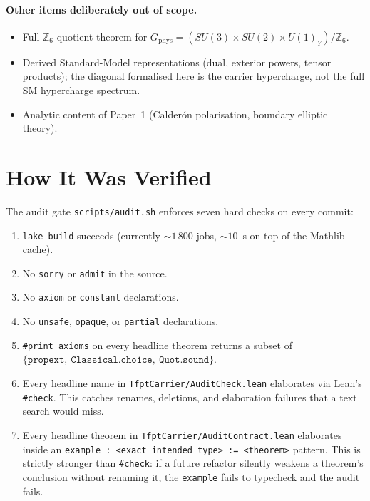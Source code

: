 \paragraph{Other items deliberately out of scope.}
\begin{itemize}[leftmargin=1.6em, itemsep=0pt]
\item Full $\mathbb Z_6$-quotient theorem for
    $G_{\mathrm{phys}} = (SU(3)\times SU(2)\times U(1)_Y)/\mathbb Z_6$.
\item Derived Standard-Model representations (dual, exterior
    powers, tensor products); the diagonal formalised here is
    the carrier hypercharge, not the full SM hypercharge
    spectrum.
\item Analytic content of Paper~1 (Calder\'on polarisation,
    boundary elliptic theory).
\end{itemize}

\section{How It Was Verified}

The audit gate \texttt{scripts/audit.sh} enforces seven hard
checks on every commit:

\begin{enumerate}[leftmargin=1.6em, itemsep=0pt]
\item \texttt{lake build} succeeds (currently $\sim 1\,800$ jobs,
      $\sim 10$~s on top of the Mathlib cache).
\item No \texttt{sorry} or \texttt{admit} in the source.
\item No \texttt{axiom} or \texttt{constant} declarations.
\item No \texttt{unsafe}, \texttt{opaque}, or \texttt{partial}
      declarations.
\item \texttt{\#print axioms} on every headline theorem returns a
      subset of $\{\texttt{propext},\ \texttt{Classical.choice},\
      \texttt{Quot.sound}\}$.
\item Every headline name in
      \texttt{TfptCarrier/AuditCheck.lean} elaborates via
      Lean's \texttt{\#check}. This catches renames, deletions,
      and elaboration failures that a text search would miss.
\item Every headline theorem in
      \texttt{TfptCarrier/AuditContract.lean} elaborates inside
      an
      \texttt{example : <exact intended type> := <theorem>}
      pattern. This is strictly stronger than \texttt{\#check}:
      if a future refactor silently weakens a theorem's
      conclusion without renaming it, the
      \texttt{example} fails to typecheck and the audit fails.
\end{enumerate}


